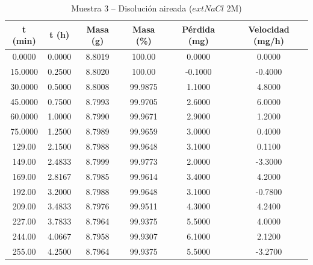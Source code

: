 \documentclass[11pt,a4paper]{article}
\begin{document}
\begin{table}[H]
\centering
\caption{Muestra 3 -- Disolución aireada ($	ext{NaCl}$ 2M)}
\label{tab:3_3_air3}
\begin{tabular}{cccccc}
\toprule
t (min) & t (h) & Masa (g) & Masa (\%) & Pérdida (mg) & Velocidad (mg/h) \\
\midrule
0.0000 & 0.0000 & 8.8019 & 100.00 & 0.0000 & 0.0000 \\
15.0000 & 0.2500 & 8.8020 & 100.00 & -0.1000 & -0.4000 \\
30.0000 & 0.5000 & 8.8008 & 99.9875 & 1.1000 & 4.8000 \\
45.0000 & 0.7500 & 8.7993 & 99.9705 & 2.6000 & 6.0000 \\
60.0000 & 1.0000 & 8.7990 & 99.9671 & 2.9000 & 1.2000 \\
75.0000 & 1.2500 & 8.7989 & 99.9659 & 3.0000 & 0.4000 \\
129.00 & 2.1500 & 8.7988 & 99.9648 & 3.1000 & 0.1100 \\
149.00 & 2.4833 & 8.7999 & 99.9773 & 2.0000 & -3.3000 \\
169.00 & 2.8167 & 8.7985 & 99.9614 & 3.4000 & 4.2000 \\
192.00 & 3.2000 & 8.7988 & 99.9648 & 3.1000 & -0.7800 \\
209.00 & 3.4833 & 8.7976 & 99.9511 & 4.3000 & 4.2400 \\
227.00 & 3.7833 & 8.7964 & 99.9375 & 5.5000 & 4.0000 \\
244.00 & 4.0667 & 8.7958 & 99.9307 & 6.1000 & 2.1200 \\
255.00 & 4.2500 & 8.7964 & 99.9375 & 5.5000 & -3.2700 \\
\bottomrule
\end{tabular}
\end{table}
\end{document}
